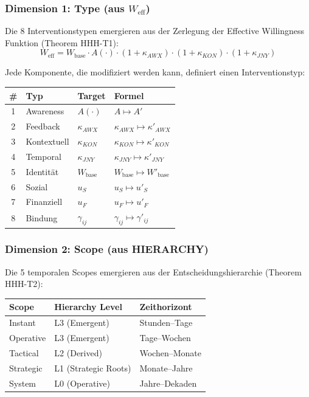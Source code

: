 \subsubsection{Dimension 1: Type (aus $W_{\text{eff}}$)}

Die 8 Interventionstypen emergieren aus der Zerlegung der Effective Willingness Funktion (Theorem HHH-T1):
\begin{equation}
W_{\text{eff}} = W_{\text{base}} \cdot A(\cdot) \cdot (1 + \kappa_{AWX}) \cdot (1 + \kappa_{KON}) \cdot (1 + \kappa_{JNY})
\label{eq:17-weff}
\end{equation}

Jede Komponente, die modifiziert werden kann, definiert einen Interventionstyp:
\begin{center}
\small
\begin{tabular}{@{}clll@{}}
\toprule
\# & \textbf{Typ} & \textbf{Target} & \textbf{Formel} \\
\midrule
1 & Awareness & $A(\cdot)$ & $A \mapsto A'$ \\
2 & Feedback & $\kappa_{AWX}$ & $\kappa_{AWX} \mapsto \kappa'_{AWX}$ \\
3 & Kontextuell & $\kappa_{KON}$ & $\kappa_{KON} \mapsto \kappa'_{KON}$ \\
4 & Temporal & $\kappa_{JNY}$ & $\kappa_{JNY} \mapsto \kappa'_{JNY}$ \\
5 & Identität & $W_{\text{base}}$ & $W_{\text{base}} \mapsto W'_{\text{base}}$ \\
6 & Sozial & $u_S$ & $u_S \mapsto u'_S$ \\
7 & Finanziell & $u_F$ & $u_F \mapsto u'_F$ \\
8 & Bindung & $\gamma_{ij}$ & $\gamma_{ij} \mapsto \gamma'_{ij}$ \\
\bottomrule
\end{tabular}
\end{center}

\subsubsection{Dimension 2: Scope (aus HIERARCHY)}

Die 5 temporalen Scopes emergieren aus der Entscheidungshierarchie (Theorem HHH-T2):
\begin{center}
\begin{tabular}{@{}lll@{}}
\toprule
\textbf{Scope} & \textbf{Hierarchy Level} & \textbf{Zeithorizont} \\
\midrule
Instant & L3 (Emergent) & Stunden--Tage \\
Operative & L3 (Emergent) & Tage--Wochen \\
Tactical & L2 (Derived) & Wochen--Monate \\
Strategic & L1 (Strategic Roots) & Monate--Jahre \\
System & L0 (Operative) & Jahre--Dekaden \\
\bottomrule
\end{tabular}
\end{center}

